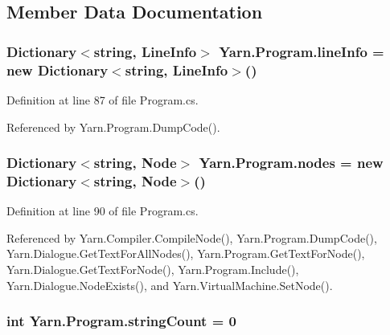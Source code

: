 \subsection{Member Data Documentation}
\hypertarget{a00146_a0d4da395947767b4a1eaaff8a9842adc}{
\subsubsection[{line\-Info}]{\setlength{\rightskip}{0pt plus 5cm}Dictionary$<$string, {\bf Line\-Info}$>$ Yarn.\-Program.\-line\-Info = new Dictionary$<$string, {\bf Line\-Info}$>$()\hspace{0.3cm}{\ttfamily [package]}}}\label{a00146_a0d4da395947767b4a1eaaff8a9842adc}


Definition at line 87 of file Program.\-cs.



Referenced by Yarn.\-Program.\-Dump\-Code().

\hypertarget{a00146_a3f4928a577c88263ad016be259b175c4}{
\subsubsection[{nodes}]{\setlength{\rightskip}{0pt plus 5cm}Dictionary$<$string, {\bf Node}$>$ Yarn.\-Program.\-nodes = new Dictionary$<$string, {\bf Node}$>$()\hspace{0.3cm}{\ttfamily [package]}}}\label{a00146_a3f4928a577c88263ad016be259b175c4}


Definition at line 90 of file Program.\-cs.



Referenced by Yarn.\-Compiler.\-Compile\-Node(), Yarn.\-Program.\-Dump\-Code(), Yarn.\-Dialogue.\-Get\-Text\-For\-All\-Nodes(), Yarn.\-Program.\-Get\-Text\-For\-Node(), Yarn.\-Dialogue.\-Get\-Text\-For\-Node(), Yarn.\-Program.\-Include(), Yarn.\-Dialogue.\-Node\-Exists(), and Yarn.\-Virtual\-Machine.\-Set\-Node().

\hypertarget{a00146_a8ef1d10094ef00311aade6715ba78ec7}{
\subsubsection[{string\-Count}]{\setlength{\rightskip}{0pt plus 5cm}int Yarn.\-Program.\-string\-Count = 0\hspace{0.3cm}{\ttfamily [private]}}}\label{a00146_a8ef1d10094ef00311aade6715ba78ec7}


